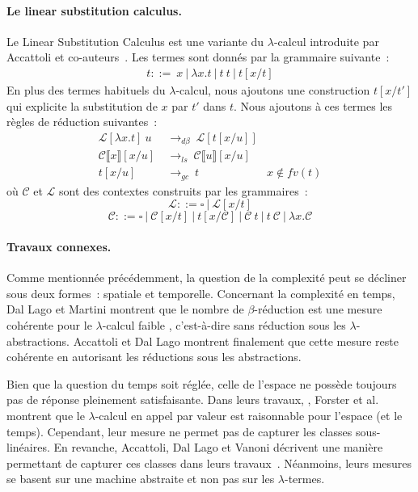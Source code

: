 \documentclass[a4paper, 11pt]{article}
\theoremstyle{definition}
\newcommand{\mcc}{\mathcal{C}}
\newcommand{\mcl}{\mathcal{L}}
\newcommand{\llb}{\llbracket}
\newcommand{\rrb}{\rrbracket}
\newcommand{\ra}{\rightarrow}
\begin{document}
\paragraph{Le linear substitution calculus.}
Le Linear Substitution Calculus est une variante du $\lambda$-calcul introduite par Accattoli et co-auteurs~\cite{accattoli2014nonstandard}.
Les termes sont donnés par la grammaire suivante~:
\begin{align*}
    t ::=~x~|~\lambda x.t~|~t~t~|~t[x/t]
\end{align*}
En plus des termes habituels du $\lambda$-calcul, nous ajoutons une construction $t[x/t']$ qui explicite la substitution de $x$ par $t'$ dans $t$.
Nous ajoutons à ces termes les règles de réduction suivantes~:
\begin{align*}
    \mcl[\lambda x.t]~u~&\ra_{d\beta}~\mcl[t[x/u]]\\
    \mcc\llb x\rrb[x/u]~&\ra_{ls}~\mcc\llb u\rrb[x/u]\\
    t[x/u]~&\ra_{gc}~t & x\notin fv(t)
\end{align*}
où $\mcc$ et $\mcl$ sont des contextes construits par les grammaires~:
\[\mcl ::= \square~|~\mcl[x/t]\]
\[\mcc ::= \square~|~\mcc[x/t]~|~t[x/\mcc]~|~\mcc~t~|~t~\mcc~|~\lambda x.\mcc\]  

\paragraph{Travaux connexes.}
  Comme mentionnée précédemment, la question de la complexité peut se décliner sous deux formes~: spatiale et temporelle.
  Concernant la complexité en temps, Dal Lago et Martini montrent que le nombre de $\beta $-réduction est une mesure cohérente pour le $\lambda$-calcul faible \cite{dal2008weak}, c'est-à-dire sans réduction sous les $\lambda$-abstractions.
  Accattoli et Dal Lago montrent finalement que cette mesure reste cohérente en autorisant les réductions sous les abstractions\cite{accattoli2016leftmost}.

  Bien que la question du temps soit réglée, celle de l'espace ne possède toujours pas de réponse pleinement satisfaisante.
  Dans leurs travaux, \cite{forster2019weak}, Forster et al. montrent que le $\lambda$-calcul en appel par valeur est raisonnable pour l'espace (et le temps).
  Cependant, leur mesure ne permet pas de capturer les classes sous-linéaires.
  En revanche, Accattoli, Dal Lago et Vanoni décrivent une manière permettant de capturer ces classes dans leurs travaux~\cite{accattoli2022reasonable}. 
  Néanmoins, leurs mesures se basent sur une machine abstraite et non pas sur les $\lambda$-termes.
\end{document}
